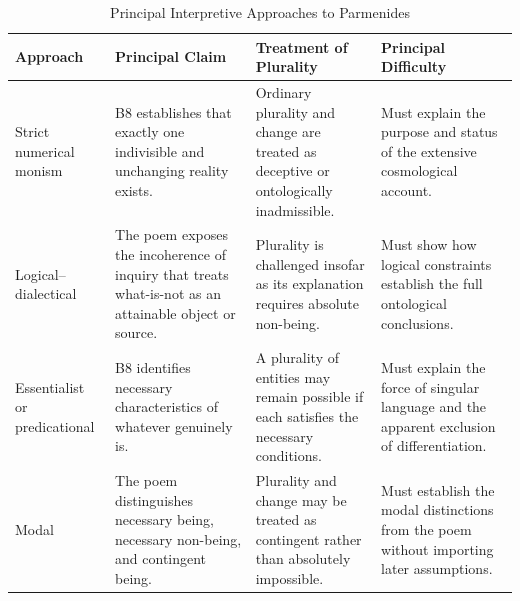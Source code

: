
%
%
%

\begin{table}[htbp]
\centering

\caption{Principal Interpretive Approaches to Parmenides}
\label{tab:ch08-parmenidean-interpretive-positions}

\small
\renewcommand{\arraystretch}{1.35}

\begin{tabularx}{\textwidth}{
    >{\raggedright\arraybackslash}p{}
    >{\raggedright\arraybackslash}X
    >{\raggedright\arraybackslash}X
    >{\raggedright\arraybackslash}X
}
\toprule

\textbf{Approach}
&
\textbf{Principal Claim}
&
\textbf{Treatment of Plurality}
&
\textbf{Principal Difficulty}
\\

\midrule

Strict numerical monism
&
B8 establishes that exactly one indivisible and unchanging
reality exists.
&
Ordinary plurality and change are treated as deceptive
or ontologically inadmissible.
&
Must explain the purpose and status of the extensive
cosmological account.
\\

Logical--dialectical
&
The poem exposes the incoherence of inquiry that treats
what-is-not as an attainable object or source.
&
Plurality is challenged insofar as its explanation requires
absolute non-being.
&
Must show how logical constraints establish the full
ontological conclusions.
\\

Essentialist or predicational
&
B8 identifies necessary characteristics of whatever
genuinely is.
&
A plurality of entities may remain possible if each
satisfies the necessary conditions.
&
Must explain the force of singular language and the
apparent exclusion of differentiation.
\\

Modal
&
The poem distinguishes necessary being, necessary
non-being, and contingent being.
&
Plurality and change may be treated as contingent
rather than absolutely impossible.
&
Must establish the modal distinctions from the poem
without importing later assumptions.
\\

\bottomrule
\end{tabularx}

\end{table}

